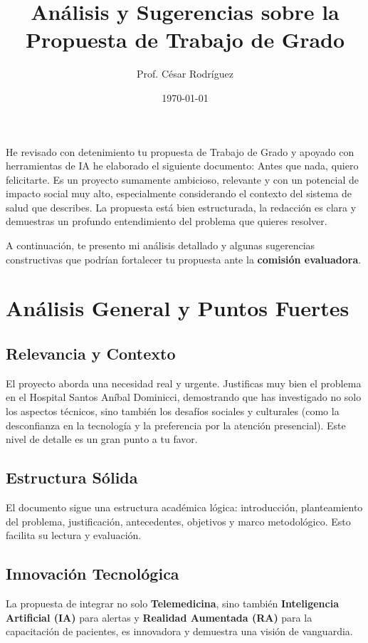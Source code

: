 \documentclass{article}
\title{Análisis y Sugerencias sobre la Propuesta de Trabajo de Grado}
\author{Prof. César Rodríguez}
\date{\today}
\begin{document}
\maketitle

He revisado con detenimiento tu propuesta de Trabajo de Grado y apoyado con herramientas de IA he elaborado el siguiente documento: Antes que nada, quiero felicitarte. Es un proyecto sumamente ambicioso, relevante y con un potencial de impacto social muy alto, especialmente considerando el contexto del sistema de salud que describes. La propuesta está bien estructurada, la redacción es clara y demuestras un profundo entendimiento del problema que quieres resolver.

A continuación, te presento mi análisis detallado y algunas sugerencias constructivas que podrían fortalecer tu propuesta ante la \textbf{comisión evaluadora}.

\section{Análisis General y Puntos Fuertes}

\subsection{Relevancia y Contexto}
El proyecto aborda una necesidad real y urgente. Justificas muy bien el problema en el Hospital Santos Aníbal Dominicci, demostrando que has investigado no solo los aspectos técnicos, sino también los desafíos sociales y culturales (como la desconfianza en la tecnología y la preferencia por la atención presencial). Este nivel de detalle es un gran punto a tu favor.

\subsection{Estructura Sólida}
El documento sigue una estructura académica lógica: introducción, planteamiento del problema, justificación, antecedentes, objetivos y marco metodológico. Esto facilita su lectura y evaluación.

\subsection{Innovación Tecnológica}
La propuesta de integrar no solo \textbf{Telemedicina}, sino también \textbf{Inteligencia Artificial (IA)} para alertas y \textbf{Realidad Aumentada (RA)} para la capacitación de pacientes, es innovadora y demuestra una visión de vanguardia.
\end{document}
